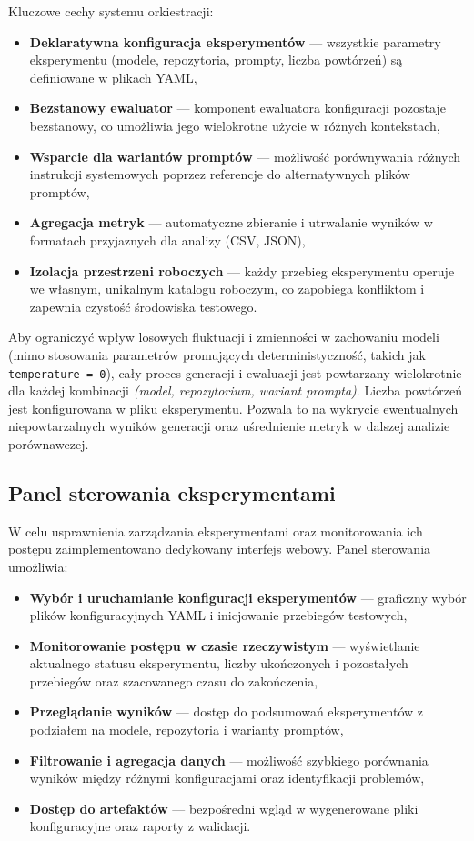 Kluczowe cechy systemu orkiestracji:
\begin{itemize}
    \item \textbf{Deklaratywna konfiguracja eksperymentów} — wszystkie parametry eksperymentu (modele, repozytoria, prompty, liczba powtórzeń) są definiowane w plikach YAML,
    \item \textbf{Bezstanowy ewaluator} — komponent ewaluatora konfiguracji pozostaje bezstanowy, co umożliwia jego wielokrotne użycie w różnych kontekstach,
    \item \textbf{Wsparcie dla wariantów promptów} — możliwość porównywania różnych instrukcji systemowych poprzez referencje do alternatywnych plików promptów,
    \item \textbf{Agregacja metryk} — automatyczne zbieranie i utrwalanie wyników w formatach przyjaznych dla analizy (CSV, JSON),
    \item \textbf{Izolacja przestrzeni roboczych} — każdy przebieg eksperymentu operuje we własnym, unikalnym katalogu roboczym, co zapobiega konfliktom i zapewnia czystość środowiska testowego.
\end{itemize}

Aby ograniczyć wpływ losowych fluktuacji i zmienności w zachowaniu modeli (mimo stosowania parametrów promujących deterministyczność, takich jak \texttt{temperature = 0}), cały proces generacji i ewaluacji jest powtarzany wielokrotnie dla każdej kombinacji \textit{(model, repozytorium, wariant prompta)}. Liczba powtórzeń jest konfigurowana w pliku eksperymentu. Pozwala to na wykrycie ewentualnych niepowtarzalnych wyników generacji oraz uśrednienie metryk w dalszej analizie porównawczej.

\subsection{Panel sterowania eksperymentami}

W celu usprawnienia zarządzania eksperymentami oraz monitorowania ich postępu zaimplementowano dedykowany interfejs webowy. Panel sterowania umożliwia:

\begin{itemize}
    \item \textbf{Wybór i uruchamianie konfiguracji eksperymentów} — graficzny wybór plików konfiguracyjnych YAML i inicjowanie przebiegów testowych,
    \item \textbf{Monitorowanie postępu w czasie rzeczywistym} — wyświetlanie aktualnego statusu eksperymentu, liczby ukończonych i pozostałych przebiegów oraz szacowanego czasu do zakończenia,
    \item \textbf{Przeglądanie wyników} — dostęp do podsumowań eksperymentów z podziałem na modele, repozytoria i warianty promptów,
    \item \textbf{Filtrowanie i agregacja danych} — możliwość szybkiego porównania wyników między różnymi konfiguracjami oraz identyfikacji problemów,
    \item \textbf{Dostęp do artefaktów} — bezpośredni wgląd w wygenerowane pliki konfiguracyjne oraz raporty z walidacji.
\end{itemize}

